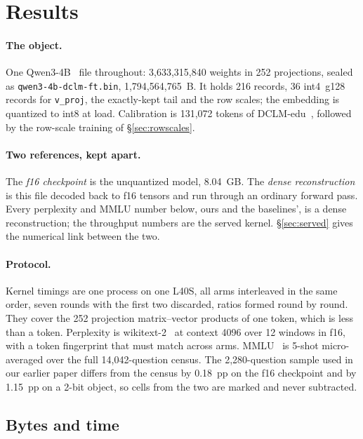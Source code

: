 \section{Results}
\label{sec:results}

\paragraph{The object.} One Qwen3-4B~\citep{qwen3_2025} file throughout:
3{,}633{,}315{,}840 weights in 252 projections, sealed as
\texttt{qwen3-4b-dclm-ft.bin}, 1{,}794{,}564{,}765~B. It holds 216 \Tetra{}
records, 36 int4~g128 records for \texttt{v\_proj}, the exactly-kept tail and
the row scales; the embedding is quantized to int8 at load. Calibration is
131{,}072 tokens of DCLM-edu~\citep{dclmedu}, followed by the row-scale
training of \S\ref{sec:rowscales}.

\paragraph{Two references, kept apart.} The \emph{f16 checkpoint} is the
unquantized model, 8.04~GB. The \emph{dense reconstruction} is this file
decoded back to f16 tensors and run through an ordinary forward pass. Every
perplexity and MMLU number below, ours and the baselines', is a dense
reconstruction; the throughput numbers are the served kernel.
\S\ref{sec:served} gives the numerical link between the two.

\paragraph{Protocol.} Kernel timings are one process on one L40S, all arms
interleaved in the same order, seven rounds with the first two discarded,
ratios formed round by round. They cover the 252 projection matrix--vector
products of one token, which is less than a token. Perplexity is
wikitext-2~\citep{wikitext2016} at context 4096 over 12 windows in f16, with a
token fingerprint that must match across arms. MMLU~\citep{mmlu2021} is 5-shot
micro-averaged over the full 14{,}042-question census. The 2{,}280-question
sample used in our earlier paper differs from the census by 0.18~pp on the f16
checkpoint and by 1.15~pp on a 2-bit object, so cells from the two are marked
and never subtracted.

\subsection{Bytes and time}

